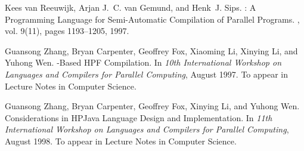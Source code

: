 \begin{thebibliography}{}
Kees van Reeuwijk, Arjan J.~C. van Gemund, and Henk~J. Sips.
: A Programming Language for Semi-Automatic Compilation of
  Parallel Programs.
, vol. 9(11), pages 1193--1205, 1997.

Guansong Zhang, Bryan Carpenter, Geoffrey Fox, Xiaoming Li, Xinying Li, and
  Yuhong Wen.
-Based {HPF} Compilation.
\newblock In {\em 10th International Workshop on Languages and Compilers for
  Parallel Computing}, August 1997.
\newblock To appear in Lecture Notes in Computer Science.

Guansong Zhang, Bryan Carpenter, Geoffrey Fox, Xinying Li, and Yuhong Wen.
\newblock Considerations in {HPJava} Language Design and Implementation.
\newblock In {\em 11th International Workshop on Languages and Compilers for
  Parallel Computing}, August 1998.
\newblock To appear in Lecture Notes in Computer Science.

\end{thebibliography}

